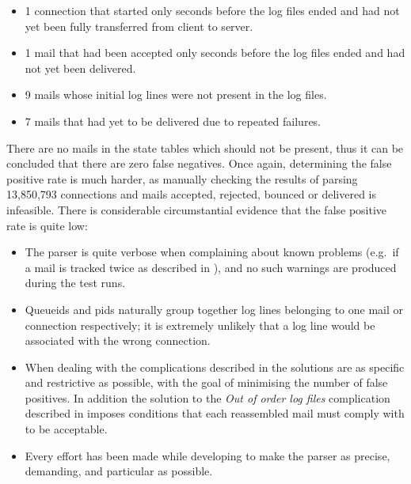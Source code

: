 \begin{itemize}

    \item 1 connection that started only seconds before the log files
        ended and had not yet been fully transferred from client to server.

    \item 1 mail that had been accepted only seconds before the log files
        ended and had not yet been delivered.

    \item 9 mails whose initial log lines were not present in the log
        files.

    \item 7 mails that had yet to be delivered due to repeated failures.

\end{itemize}

There are no mails in the state tables which should not be present, thus it
can be concluded that there are zero false negatives.  Once again,
determining the false positive rate is much harder, as manually checking
the results of parsing 13,850,793 connections and mails accepted, rejected,
bounced or delivered is infeasible.  There is considerable circumstantial
evidence that the false positive rate is quite low:

\begin{itemize}

    \item The parser is quite verbose when complaining about known problems
        (e.g.\ if a mail is tracked twice as described in
        ), and no such warnings are
        produced during the test runs.

    \item Queueids and \glspl{pid} naturally group together log lines
        belonging to one mail or connection respectively; it is extremely
        unlikely that a log line would be associated with the wrong
        connection.

    \item When dealing with the complications described in
         the solutions are as specific and
        restrictive as possible, with the goal of minimising the number of
        false positives.  In addition the solution to the \textit{Out of
        order log files\/} complication described in  imposes conditions that each reassembled mail must
        comply with to be acceptable.

    \item Every effort has been made while developing to make the parser as
        precise, demanding, and particular as possible.

\end{itemize}

